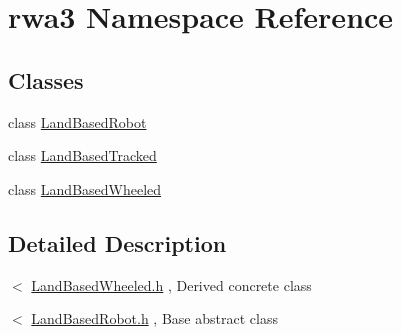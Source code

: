 \hypertarget{namespacerwa3}{}\section{rwa3 Namespace Reference}
\label{namespacerwa3}
\subsection*{Classes}
\begin{DoxyCompactItemize}
\item 
class \hyperlink{classrwa3_1_1_land_based_robot}{Land\+Based\+Robot}
\item 
class \hyperlink{classrwa3_1_1_land_based_tracked}{Land\+Based\+Tracked}
\item 
class \hyperlink{classrwa3_1_1_land_based_wheeled}{Land\+Based\+Wheeled}
\end{DoxyCompactItemize}


\subsection{Detailed Description}
$<$ \hyperlink{landbasedwheeled_8h}{Land\+Based\+Wheeled.\+h} , Derived concrete class

$<$ \hyperlink{_land_based_robot_8h}{Land\+Based\+Robot.\+h} , Base abstract class 
